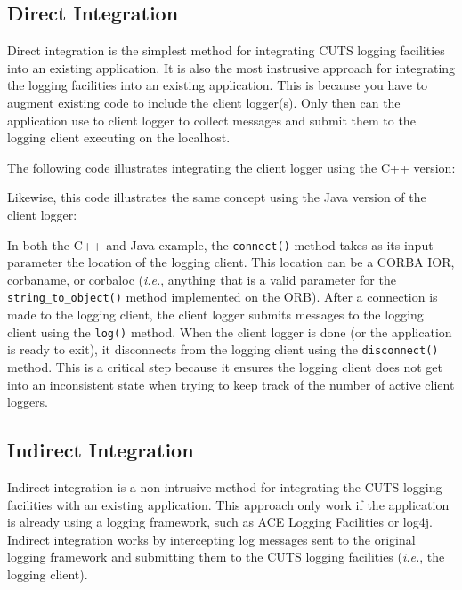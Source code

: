 \subsection{Direct Integration}
\label{sec:client-loggers-direct}

Direct integration is the simplest method for integrating CUTS
logging facilities into an existing application. It is also the most
instrusive approach for integrating the logging facilities into an
existing application. This is because you have to augment existing
code to include the client logger(s). Only then can the application
use to client logger to collect messages and submit them to the 
logging client executing on the localhost.

The following code illustrates integrating the client logger using
the C++ version:

Likewise, this code illustrates the same concept using the Java
version of the client logger:


In both the C++ and Java example, the \texttt{connect()} method 
takes as its input parameter the location of the logging client. This
location can be a CORBA IOR, corbaname, or corbaloc (\textit{i.e.},
anything that is a valid parameter for the \texttt{string\_to\_object()}
method implemented on the ORB). After a connection is made to the 
logging client, the client logger submits messages to the logging
client using the \texttt{log()} method. When the client logger is 
done (or the application is ready to exit), it disconnects from the 
logging client using the \texttt{disconnect()} method. This is a 
critical step because it ensures the logging client does not get into 
an inconsistent state when trying to keep track of the number of 
active client loggers.

\subsection{Indirect Integration}
\label{sec:client-loggers-indirect}

Indirect integration is a non-intrusive method for integrating the 
CUTS logging facilities with an existing application. This approach
only work if the application is already using a logging framework,
such as ACE Logging Facilities or log4j. Indirect integration works
by intercepting log messages sent to the original logging framework
and submitting them to the CUTS logging facilities (\textit{i.e.},
the logging client). 

